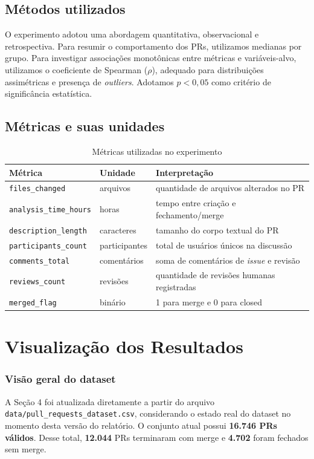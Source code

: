 \documentclass[12pt,a4paper]{article}
\begin{document}
\subsection{M\'etodos utilizados}
O experimento adotou uma abordagem quantitativa, observacional e retrospectiva. Para resumir o comportamento dos PRs, utilizamos medianas por grupo. Para investigar associa\c{c}\~oes monot\^onicas entre m\'etricas e vari\'aveis-alvo, utilizamos o coeficiente de Spearman ($\rho$), adequado para distribui\c{c}\~oes assim\'etricas e presen\c{c}a de \textit{outliers}. Adotamos $p < 0{,}05$ como crit\'erio de signific\^ancia estat\'istica.

\subsection{M\'etricas e suas unidades}
\begin{table}[H]
\centering
\caption{M\'etricas utilizadas no experimento}
\begin{tabularx}{\textwidth}{@{}p{}p{}X@{}}
\toprule
M\'etrica & Unidade & Interpreta\c{c}\~ao \\ \midrule
\texttt{files\_changed} & arquivos & quantidade de arquivos alterados no PR \\
\texttt{analysis\_time\_hours} & horas & tempo entre cria\c{c}\~ao e fechamento/merge \\
\texttt{description\_length} & caracteres & tamanho do corpo textual do PR \\
\texttt{participants\_count} & participantes & total de usu\'arios \'unicos na discuss\~ao \\
\texttt{comments\_total} & coment\'arios & soma de coment\'arios de \textit{issue} e revis\~ao \\
\texttt{reviews\_count} & revis\~oes & quantidade de revis\~oes humanas registradas \\
\texttt{merged\_flag} & bin\'ario & 1 para merge e 0 para closed \\ \bottomrule
\end{tabularx}
\end{table}

\section{Visualiza\c{c}\~ao dos Resultados}

\subsubsection{Vis\~ao geral do dataset}
A Se\c{c}\~ao 4 foi atualizada diretamente a partir do arquivo \texttt{data/pull\_requests\_dataset.csv}, considerando o estado real do dataset no momento desta vers\~ao do relat\'orio. O conjunto atual possui \textbf{16.746 PRs v\'alidos}. Desse total, \textbf{12.044} PRs terminaram com merge e \textbf{4.702} foram fechados sem merge.
\end{document}
